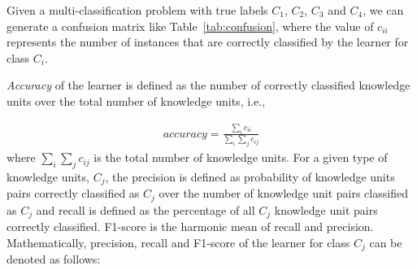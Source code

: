\documentclass[sigconf,review, anonymous]{acmart}
\theoremstyle{break}
\newcommand{\tab}[1]{Table~\ref{tab:#1}}
\begin{document}
\begin{table}[htp]
\caption {Confusion Matrix.}
\scriptsize
{}

\label{tab:confusion}
\end{table}

Given a multi-classification problem with true labels $C_1$, 
$C_2$, $C_3$ and $C_4$, we can generate a confusion matrix like \tab{confusion}, 
where the value of $c_{ii}$ represents the number of instances that are correctly classified
by the learner for class $C_i$. 

{\it Accuracy} of the learner is defined as the number of  correctly
classified knowledge units over the total number of knowledge units, i.e.,


{\[
\begin{array}{ll}
accuracy = \frac{\sum_i c_{ii}}{\sum_{i}\sum_{j}c_{ij}}
\end{array}
\]}
where ${\sum_{i}\sum_{j}c_{ij}}$ is the total number of knowledge units.
For a given type of knowledge units, $C_j$, the  precision is defined as probability of
knowledge units pairs correctly classified as $C_j$ over the number of knowledge unit pairs classified as $C_j$ and
 recall is defined as the percentage of all $C_j$ knowledge unit pairs correctly classified. F1-score is the harmonic mean of
 recall and precision. Mathematically,
  precision, recall and  F1-score of 
the learner for class $C_j$ can be denoted as follows:
\end{document}
